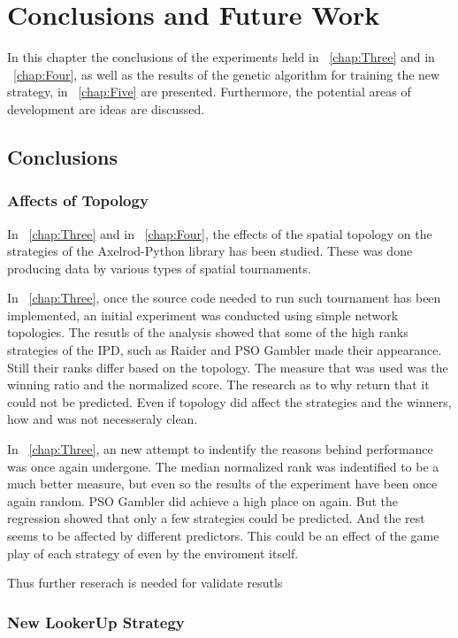 \chapter{Conclusions and Future Work}
\label{chap:Six}

In this chapter the conclusions of the experiments held in
~\autoref{chap:Three} and in ~\autoref{chap:Four}, as well as the results
of the genetic algorithm for training the new strategy, in ~\autoref{chap:Five}
are presented. Furthermore, the potential areas of development are
ideas are discussed.

\section{Conclusions}
\subsection{Affects of Topology}

In ~\autoref{chap:Three} and in ~\autoref{chap:Four}, the effects of the spatial
topology on the strategies of the Axelrod-Python library has been studied. These
was done producing data by various types of spatial tournaments.

In ~\autoref{chap:Three}, once the source code needed to run such tournament
has been implemented, an initial experiment was conducted using simple network
topologies. The resutls of the analysis showed that some of the high ranks strategies
of the IPD, such as Raider and PSO Gambler made their appearance. Still their
ranks differ based on the topology. The measure that was used was the winning
ratio and the normalized score. The research as to why return that it could
not be predicted. Even if topology did affect the strategies and the winners,
how and was not necesseraly clean.

In ~\autoref{chap:Three}, an new attempt to indentify the reasons behind performance
was once again undergone. The median normalized rank was indentified to be a much better
measure, but even so the results of the experiment have been once again random.
PSO Gambler did achieve a high place on again. But the regression showed that
only a few strategies could be predicted. And the rest seems to be affected
by different predictors. This could be an effect of the game play of each strategy
of even by the enviroment itself.

Thus further reserach is needed for validate resutls
\subsection{New LookerUp Strategy}

